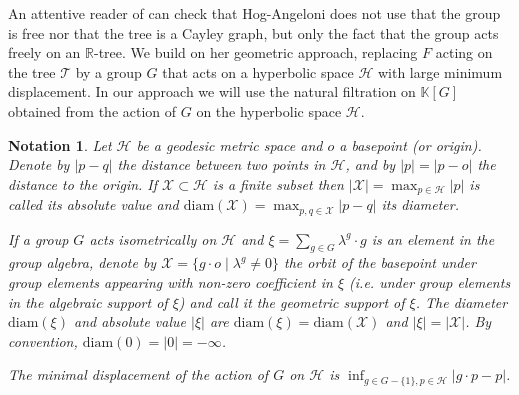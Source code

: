 \documentclass[11pt,letterpaper]{amsart}
\newtheorem*{notation}{Notation}
\begin{document}
An attentive reader of \cite{hogangeloni} can check that Hog-Angeloni does not use that the group is free nor that the tree is a Cayley graph, but only the fact that the group acts freely on an $\mathbb R$-tree. We build on her geometric approach, replacing $F$ acting on the tree $\mathcal T$ by a group $G$ that acts on a hyperbolic space $\mathcal H$ with large minimum displacement. %
In our approach we will use the natural filtration on $\mathbb K[G]$ obtained from the action of $G$ on the hyperbolic space $\mathcal H$. 

\begin{notation} 
Let $\mathcal H$ be a geodesic metric space and $o$ a basepoint (or origin). Denote by $|p-q|$ the distance between two points in $\mathcal H$, and by $|p|=|p-o|$ the distance to the origin. If $\mathcal X\subset\mathcal H$ is a finite subset then $|\mathcal X|=\max_{p\in\mathcal H}|p|$ is called its absolute value and $\mathrm{diam}(\mathcal X)=\max_{p,q\in\mathcal X}|p-q|$ its diameter. 

If a group $G$ acts isometrically on $\mathcal H$ and $\xi=\sum_{g\in G}\lambda^g\cdot g$ is an element in the group algebra, denote by $\mathcal X=\{g\cdot o\mid \lambda^g\not=0\}$ the orbit of the basepoint under group elements appearing with non-zero coefficient in $\xi$ (i.e. under group elements in the algebraic support of $\xi$) and call it the geometric support of $\xi$.
The diameter $\mathrm{diam}(\xi)$ and absolute value $|\xi|$ are $\mathrm{diam}(\xi)=\mathrm{diam}(\mathcal X)$ and $|\xi|=|\mathcal X|$. By convention, $\mathrm{diam} (0) = | 0 | = - \infty$. 

The minimal displacement of the action of $G$ on $\mathcal H$ is $\inf_{g\in G-\{1\}, p\in\mathcal H}|g\cdot p-p|$. 
\end{notation}
\end{document}
